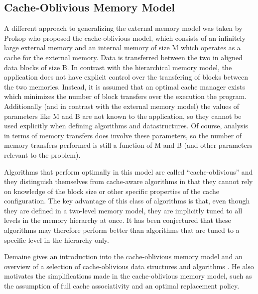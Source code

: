 \documentclass{acm_proc_article-sp}
\begin{document}
\subsection{Cache-Oblivious Memory Model}
A different approach to generalizing the external memory model was taken by Prokop \cite{prokop1999coa} who proposed the cache-oblivious model, which consists of an infinitely large external memory and an internal memory of size M which operates as a cache for the external memory. Data is transferred between the two in aligned data blocks of size B. In contrast with the hierarchical memory model, the application does not have explicit control over the transfering of blocks between the two memories. Instead, it is assumed that an optimal cache manager exists which minimizes the number of block transfers over the execution the program. Additionally (and in contrast with the external memory model) the values of parameters like M and B are not known to the application, so they cannot be used explicitly when defining algorithms and datastructures. Of course, analysis in terms of memory transfers does involve these parameters, so the number of memory transfers performed is still a function of M and B (and other parameters relevant to the problem).

Algorithms that perform optimally in this model are called ``cache-oblivious'' and they distinguish themselves from cache-aware algorithms in that they cannot rely on knowledge of the block size or other specific properties of the cache configuration. The key advantage of this class of algorithms is that, even though they are defined in a two-level memory model, they are implicitly tuned to all levels in the memory hierarchy at once. It has been conjectured that these algorithms may therefore perform better than algorithms that are tuned to a specific level in the hierarchy only.

Demaine gives an introduction into the cache-oblivious memory model and an overview of a selection of cache-oblivious data structures and algorithms \cite{demaine2002coa}. He also motivates the simplifications made in the cache-oblivious memory model, such as the assumption of full cache associativity and an optimal replacement policy.

\end{document}
